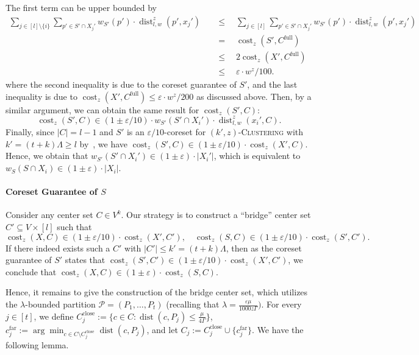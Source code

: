 \documentclass[letterpaper,11pt]{article}
\theoremstyle{plain}
\theoremstyle{definition}
\theoremstyle{remark}
\DeclareMathOperator{\cost}{cost}
\DeclareMathOperator{\dist}{dist}
\newcommand{\far}{\mathrm{far}}
\newcommand{\close}{\mathrm{close}}
\newcommand{\eps}{\varepsilon}
\newcommand{\calP}{\mathcal{P}}
\newcommand{\ProblemName}[1]{\textsc{#1}}
\newcommand{\tzC}[1]{\ProblemName{$(#1,z)$-Clustering}\xspace}
\begin{document}
The first term can be upper bounded by 
\begin{align*}
    \sum_{j\in [l]\setminus\{i\}} \sum_{p'\in S'\cap X_j'} w_{S'}(p')\cdot \dist^z_{l,w}(p',x_j')\quad&\le\quad \sum_{j\in [l]} \sum_{p'\in S'\cap X_j'} w_{S'}(p')\cdot \dist^z_{l,w}(p',x_j')\\
    &=\quad \cost_z(S',C^\mathrm{full})\\
    &\le\quad 2\cost_z(X',C^\mathrm{full})\\
    &\le\quad \eps\cdot w^z / 100.
\end{align*}
where the second inequality is due to the coreset guarantee of $S'$, and the last inequality is due to $\cost_z(X',C^\mathrm{full}) \le \eps \cdot w^z / 200$ as discussed above.
Then, by a similar argument, we can obtain the same result for $\cost_z(S',C)$:
\begin{equation}
\label{eq:cost S'}
\cost_z(S',C)\in (1\pm \eps/10)\cdot w_{S'}(S'\cap X_i')\cdot \dist^z_{l,w}(x_i',C).
\end{equation}
Finally, since $|C| = l-1$ and $S'$ is an $\eps/10$-coreset for \tzC{k'} with $k' = (t+k)\Lambda\ge l$ by~, we have $\cost_z(S',C)\in (1\pm\eps/10)\cdot \cost_z(X',C)$. Hence, we obtain that $w_{S'}(S'\cap X_i')\in (1\pm \eps)\cdot |X_i'|$, which is equivalent to $w_{S}(S\cap X_i)\in (1\pm \eps)\cdot |X_i|$.



\paragraph{Coreset Guarantee of $S$} Consider any center set $C\in V^k$. Our strategy is to construct a ``bridge'' center set $C'\subseteq V\times [l]$ such that 
\begin{equation}
\label{eq:bridge}
\cost_z(X,C)\in (1\pm \eps/10)\cdot \cost_z(X',C'),\quad \cost_z(S,C)\in (1\pm \eps/10)\cdot \cost_z(S',C').
\end{equation}
If there indeed exists such a $C'$ with $|C'|\le k'= (t+k)\Lambda$, then as the coreset guarantee of $S'$ states that $\cost_z(S',C')\in (1\pm \eps/10)\cdot \cost_z(X',C')$, we conclude that $\cost_z(X,C)\in (1\pm \eps)\cdot \cost_z(S,C)$.

Hence, it remains to give the construction of the bridge center set, which utilizes the $\lambda$-bounded partition $\calP=(P_1,\dots, P_t)$ (recalling that $\lambda = \frac{\eps\mu}{1000z\Gamma})$. For every $j\in [t]$, we define $C_j^\close:=\{c\in C: \dist(c,P_j)\le \frac{\mu}{4\Gamma} \}$, $c_j^\far:= \arg\min_{c\in C\setminus C_j^\close} \dist(c, P_j)$, and let $C_j:=C_j^\close\cup \{c_j^\far\}$. We have the following lemma.
\end{document}
